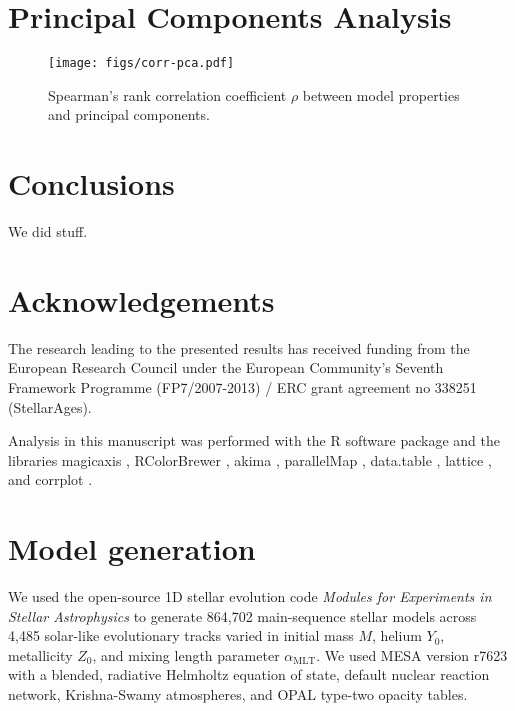 \documentclass[a4paper,fleqn,usenatbib,useAMS]{mnras}
\begin{document}
\section{Principal Components Analysis}

\begin{figure}
\centering
\texttt{[image: figs/corr-pca.pdf]}
\caption{Spearman's rank correlation coefficient $\rho$ between model properties and principal components. } 
\label{fig:corrpca}
\end{figure}


\section{Conclusions}
We did stuff. 


\section*{Acknowledgements} The research leading to the presented results has received funding from the European Research Council under the European Community's Seventh Framework Programme (FP7/2007-2013) / ERC grant agreement no 338251 (StellarAges). 

Analysis in this manuscript was performed with the R software package \citep{R} and the libraries magicaxis \citep{magicaxis}, RColorBrewer \citep{RColorBrewer}, akima \citep{akima}, parallelMap \citep{parallelMap}, data.table \citep{data.table}, lattice \citep{lattice}, and corrplot \citep{corrplot}. 





\appendix

\section{Model generation}
\label{sec:models}
We used the open-source 1D stellar evolution code \emph{Modules for Experiments
in Stellar Astrophysics} \citep[MESA,][]{2015ApJS..220...15P} to generate 864,702 main-sequence stellar models across 4,485 solar-like evolutionary tracks varied in initial mass $M$, helium $Y_0$, metallicity $Z_0$, and mixing length parameter $\alpha_{\text{MLT}}$. We used MESA version r7623 with a blended, radiative Helmholtz equation of state, default nuclear reaction network, Krishna-Swamy atmospheres, and OPAL type-two opacity tables. 
\end{document}
